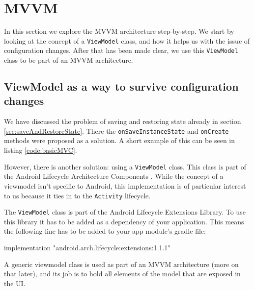 \section{MVVM}
In this section we explore the MVVM architecture step-by-step. 
We start by looking at the concept of a \lstinline!ViewModel! class, and how it helps us with the issue of configuration changes.
After that has been made clear, we use this \lstinline!ViewModel! class to be part of an MVVM architecture. 

\subsection{ViewModel as a way to survive configuration changes}
We have discussed the problem of saving and restoring state already in section \ref{sec:saveAndRestoreState}. 
There the \lstinline!onSaveInstanceState! and \lstinline!onCreate! methods were proposed as a solution.
A short example of this can be seen in listing \ref{code:basicMVC}.



However, there is another solution: using a \lstinline!ViewModel! class.
This class is part of the Android Lifecycle Architecture Components \cite{viewModelOfficial}.
While the concept of a viewmodel isn't specific to Android, this implementation is of particular interest to us because it ties in to the \lstinline!Activity! lifecycle.

The \lstinline!ViewModel! class is part of the Android Lifecycle Extensions Library.
To use this library it has to be added as a dependency of your application.
This means the following line has to be added to your app module's gradle file:

\begin{android}
	implementation "android.arch.lifecycle:extensions:1.1.1"
\end{android}


A generic viewmodel class is used as part of an MVVM architecture (more on that later), and its job is to hold all elements of the model that are exposed in the UI.

